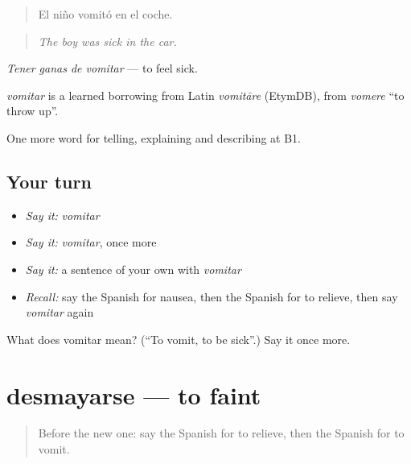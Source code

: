 \begin{quote}
El niño vomitó en el coche.
\end{quote}

\begin{quote}
\emph{The boy was sick in the car.}
\end{quote}

\emph{Tener ganas de vomitar} — to feel sick.

\begin{cousinweb}
\emph{vomitar} is a learned borrowing from Latin \emph{vomitāre} (EtymDB), from \emph{vomere} \textquotedblleft{}to throw up\textquotedblright{}.
\end{cousinweb}

\begin{grammarlens}[title={What you've built}]
One more word for telling, explaining and describing at B1.
\end{grammarlens}

\subsection*{Your turn}
\begin{itemize}
\raggedright
  \item \emph{Say it:} \emph{vomitar}
  \item \emph{Say it:} \emph{vomitar}, once more
  \item \emph{Say it:} a sentence of your own with \emph{vomitar}
  \item \emph{Recall:} say the Spanish for nausea, then the Spanish for to relieve, then say \emph{vomitar} again
\end{itemize}

\begin{tcolorbox}[breakable,colback=teal!4,colframe=teal!35!black,title={Before you move on}]
What does vomitar mean? (\textquotedblleft{}To vomit, to be sick\textquotedblright{}.) Say it once more.
\end{tcolorbox}
\section[desmayarse]{desmayarse — to faint}

\label{lesson:ES-C740-desmayarse}



\begin{quote}
Before the new one: say the Spanish for to relieve, then the Spanish for to vomit.
\end{quote}

